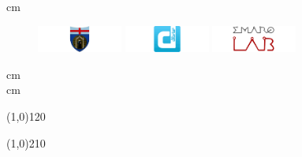\begin{frame}[plain,c]
	\begin{center}
			 cm
			\begin{figure}[htp]
				  \centering
				  \includegraphics[width=0.25\textwidth]{./figures/logo/unige.pdf}
				  \hskip 0.5cm
				  \includegraphics[width=0.25\textwidth]{./figures/logo/dibris2.pdf}
				  \hskip 0.5cm
				  \includegraphics[width=0.25\textwidth]{./figures/logo/emaroLab.pdf}
			\end{figure}
			 cm
			{\small \theInstitute \\}
			 cm
	\end{center}

	\vfill

	\line(1,0){120}
	\begin{flushleft}\em\textsc{\textbf{\Large\theTitle}}\end{flushleft}
	\begin{center}\em\textsc{\textit{\large\theShortTitle}}\end{center}
	\line(1,0){210}  

	\vfill

	\halfPage{		
	     \begin{flushleft}\theAuthor\end{flushleft}
	}{
	     \begin{flushright}\theCooathor\end{flushright}
	}
	
	\vfill			
	
	\begin{center}
	    \scriptsize
	    \theConference\\
	    \theDate
	\end{center}
\end{frame}
